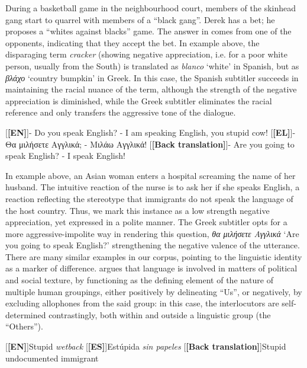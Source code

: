 \documentclass[output=paper]{LSP/langsci}
\begin{document}
During a basketball game in the neighbourhood court, members of the skinhead gang start to quarrel with members of a “black gang”. Derek has a bet; he proposes a “whites against blacks” game. The answer in  comes from one of the opponents, indicating that they accept the bet.
In example  above, the disparaging term \textit{cracker} (showing negative appreciation, i.e. for a poor white person, usually from the South) is translated as \textit{blanco} `white' in Spanish, but as \textit{βλάχο} `country bumpkin' in Greek. In this case, the Spanish subtitler succeeds in maintaining the racial nuance of the term, although the strength of the negative appreciation is diminished, while the Greek subtitler eliminates the racial reference and only transfers the aggressive tone of the dialogue. 

\ea \label{ex:2:25}
\begin{xlist}
\exi{}[\textbf{[EN]}]{- Do you speak English? - I am speaking English, you stupid cow!}
\exi{}[\textbf{[EL]}]{- Θα μιλήσετε Αγγλικά; - Μιλάω Αγγλικά!}
\exi{}[\textbf{[Back translation]}]{- Are you going to speak English? - I speak English!}
\end{xlist}
\z

In example  above, an Asian woman enters a hospital screaming the name of her husband. The intuitive reaction of the nurse is to ask her if she speaks English, a reaction reflecting the stereotype that immigrants do not speak the language of the host country. Thus, we mark this instance as a low strength negative appreciation, yet expressed in a polite manner. The Greek subtitler opts for a more aggressive-impolite way in rendering this question, \textit{θα μιλήσετε Αγγλικά} `Are you going to speak English?' strengthening the negative valence of the utterance. There are many similar examples in our corpus, pointing to the linguistic identity as a marker of difference. \citet[111]{Sella2001} argues that language is involved in matters of political and social texture, by functioning as the defining element of the nature of multiple human groupings, either positively by delineating “Us”, or negatively, by excluding allophones from the said group: in this case, the interlocutors are self-determined contrastingly, both within and outside a linguistic group (the “Others”).

\ea \label{ex:2:26}
\begin{xlist}
\exi{}[\textbf{[EN]}]{Stupid \emph{wetback}}
\exi{}[\textbf{[ES]}]{Estúpida \emph{sin papeles}}
\exi{}[\textbf{[Back translation]}]{Stupid undocumented immigrant}
\end{xlist}
\z
\end{document}
